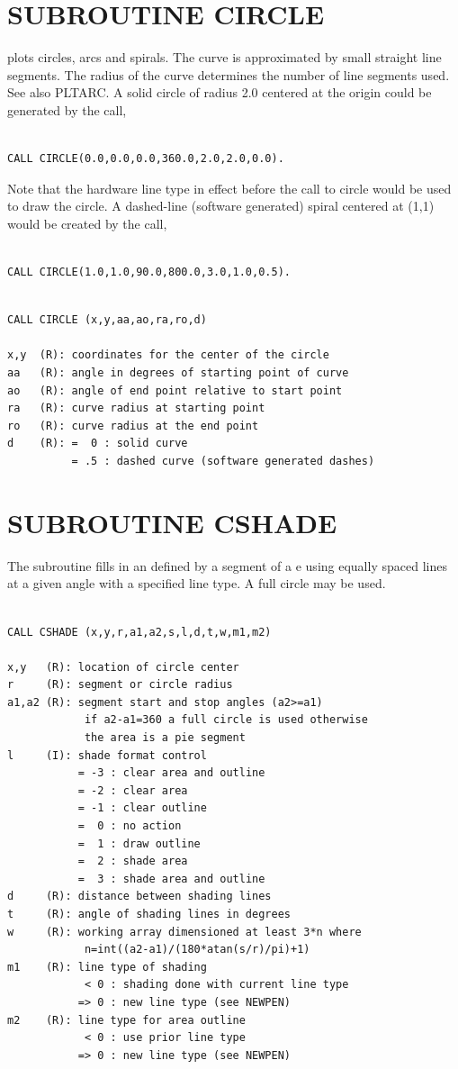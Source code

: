 \documentclass[11pt]{report}
\begin{document}
\section{SUBROUTINE CIRCLE}

 plots circles, arcs and spirals.  The curve is approximated by small
straight line segments.  The radius of the curve determines the number of line
segments used.  See also PLTARC. A solid circle of radius 2.0 centered at the
origin could be generated by the call,
\begin{verbatim}

CALL CIRCLE(0.0,0.0,0.0,360.0,2.0,2.0,0.0).

\end{verbatim}
Note that the hardware line type in effect before the call to circle
would be used to draw the circle.  A dashed-line (software generated)
spiral centered at (1,1) would be created by the call,
\begin{verbatim}

CALL CIRCLE(1.0,1.0,90.0,800.0,3.0,1.0,0.5).
\end{verbatim}
\begin{verbatim}

CALL CIRCLE (x,y,aa,ao,ra,ro,d)

x,y  (R): coordinates for the center of the circle
aa   (R): angle in degrees of starting point of curve
ao   (R): angle of end point relative to start point
ra   (R): curve radius at starting point
ro   (R): curve radius at the end point
d    (R): =  0 : solid curve
          = .5 : dashed curve (software generated dashes)
\end{verbatim}


\section{SUBROUTINE CSHADE}

The  subroutine fills in an  defined by a segment of a e
using equally spaced lines at a given angle with a 
specified line type.  A full circle may be used.
\begin{verbatim}

CALL CSHADE (x,y,r,a1,a2,s,l,d,t,w,m1,m2)

x,y   (R): location of circle center
r     (R): segment or circle radius
a1,a2 (R): segment start and stop angles (a2>=a1)
            if a2-a1=360 a full circle is used otherwise
            the area is a pie segment
l     (I): shade format control
           = -3 : clear area and outline
           = -2 : clear area
           = -1 : clear outline
           =  0 : no action
           =  1 : draw outline
           =  2 : shade area
           =  3 : shade area and outline
d     (R): distance between shading lines
t     (R): angle of shading lines in degrees
w     (R): working array dimensioned at least 3*n where
            n=int((a2-a1)/(180*atan(s/r)/pi)+1)
m1    (R): line type of shading
            < 0 : shading done with current line type
           => 0 : new line type (see NEWPEN)
m2    (R): line type for area outline
            < 0 : use prior line type
           => 0 : new line type (see NEWPEN)
\end{verbatim}
\end{document}
